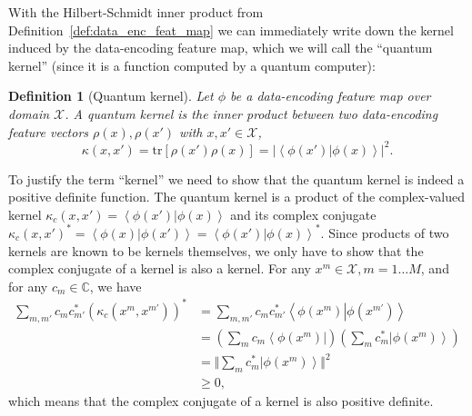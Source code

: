 \documentclass[aps, reprint, onecolumn, nofootinbib, longbibliography]{revtex4-2}
\newtheorem{definition}{Definition}[]
\newcommand{\ket}[1]{\ensuremath{\left| #1 \right \rangle}}
\newcommand{\bra}[1]{\ensuremath{\left \langle #1 \right |}}
\newcommand{\braket}[2]{\ensuremath{\left\langle #1\left|#2 \right.\right\rangle}}
\newcommand{\tr}[1]{ \mathrm{tr}\left[#1\right] }
\begin{document}
With the Hilbert-Schmidt inner product from Definition~\ref{def:data_enc_feat_map} we can immediately write down the kernel induced by the data-encoding feature map, which we will call the ``quantum kernel'' (since it is a function computed by a quantum computer):
\begin{definition}[Quantum kernel]\label{def:quantum_kernel}
Let $\phi$ be a data-encoding feature map over domain $\mathcal{X}$. A quantum kernel is the inner product between two data-encoding feature vectors $\rho(x), \rho(x')$ with $x, x' \in \mathcal{X}$,
\begin{equation}
    \kappa(x, x') = \tr{\rho(x') \rho(x)} = |\braket{\phi(x')}{\phi(x)}|^2.
\end{equation}
\end{definition}

To justify the term ``kernel'' we need to show that the quantum kernel is indeed a positive definite function. The quantum kernel is a product of the complex-valued kernel $\kappa_c(x, x') = \braket{\phi(x')}{\phi(x)}$ and its complex conjugate $\kappa_c(x, x')^* = \braket{\phi(x)}{\phi(x')} = \braket{\phi(x')}{\phi(x)}^*$. Since products of two kernels are known to be kernels themselves, we only have to show that the complex conjugate of a kernel is also a kernel. 
For any $x^m \in \mathcal{X}, m=1 \dots M$, and for any $c_m \in \mathbb{C}$, we have
\begin{align*}
    \sum_{m, m'} c_m c^*_{m'} \left(\kappa_c(x^m, x^{m'})\right)^* &= \sum_{m, m'} c_m c^*_{m'} \braket{\phi(x^{m})}{\phi(x^{m'})}\\
    &= \left(\sum_m c_m \bra{\phi(x^m)} \right) \left( \sum_m c^*_m \ket{\phi(x^m)}\right)\\
    &=  \Vert \sum_m c^*_m \ket{\phi(x^m)}  \Vert^2\\
    &\geq 0,
\end{align*}
which means that the complex conjugate of a kernel is also positive definite.
\end{document}
